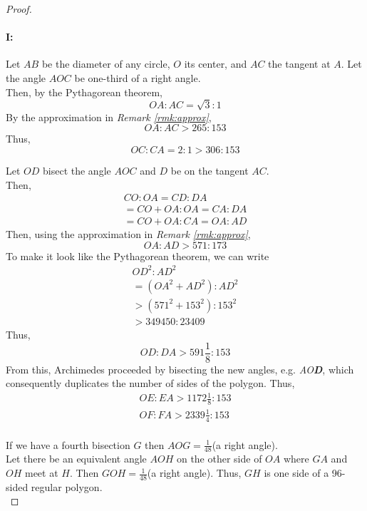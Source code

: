 \documentclass{article}
\begin{document}
\begin{proof}
\,
\paragraph{I:} \label{prt:1}
Let $AB$ be the diameter of any circle, $O$ its center, and $AC$ the tangent at $A$. Let the angle $AOC$ be one-third of a right angle.\\

    Then, by the Pythagorean theorem, 
    \[OA : AC = \sqrt{3} :1\]
    By the approximation in \textit{Remark \ref{rmk:approx}}, 
    \[OA : AC > 265:153\]
    Thus,
    \[OC : CA = 2:1>306:153\]

    Let $OD$ bisect the angle $AOC$ and $D$ be on the tangent $AC$.\\

    Then,
    \begin{align*}
        CO:OA = CD:DA\\
        =CO+OA:OA = CA:DA\\
        =CO+OA:CA = OA:AD
    \end{align*}
    Then, using the approximation in \textit{Remark \ref{rmk:approx}},
    \[OA:AD>571:173\]
    To make it look like the Pythagorean theorem, we can write
    \begin{align*}
        OD^2:AD^2\\
        =(OA^2 +AD^2):AD^2\\
        >(571^2+153^2):153^2\\
        >349450:23409
    \end{align*}
    Thus,
    \[OD:DA>591\frac{1}{8}:153\]
    From this, Archimedes proceeded by bisecting the new angles, e.g. \textit{AO\textbf{D}}, which consequently duplicates the number of sides of the polygon. Thus,
    \[\begin{array}{c}
        OE:EA >1172\frac{1}{8}:153\\
        OF:FA > 2339\frac{1}{4}:153\\
    \end{array}\]
    
    If we have a fourth bisection $G$ then $AOG = \frac{1}{48}$(a right angle). \\
    
    Let there be an equivalent angle $AOH$ on the other side of $OA$ where $GA$ and $OH$ meet at $H$. Then $GOH = \frac{1}{48}$(a right angle). Thus, $GH$ is one side of a 96-sided regular polygon.\\


\end{proof}
\end{document}

